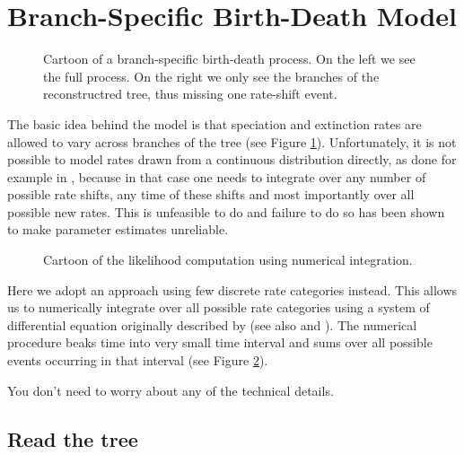 

\bigskip
\section{Branch-Specific Birth-Death Model}

\begin{figure}[htbp!]
\centering
{}
\caption{\small Cartoon of a branch-specific birth-death process. On the left we see the full process. On the right we only see the branches of the reconstructred tree, thus missing one rate-shift event.}
\label{fig:BSBD}
\end{figure}
The basic idea behind the model is that speciation and extinction rates are allowed to vary across branches of the tree (see Figure \ref{fig:BSBD}).
Unfortunately, it is not possible to model rates drawn from a continuous distribution directly, as done for example in \BAMM, because in that case one needs to integrate over any number of possible rate shifts, any time of these shifts and most importantly over all possible new rates.
This is unfeasible to do and failure to do so has been shown to make parameter estimates unreliable.

\begin{figure}[htbp!]
\centering
{}
\caption{\small Cartoon of the likelihood computation using numerical integration.}
\label{fig:BSBD_likelihood}
\end{figure}
Here we adopt an approach using few discrete rate categories instead.
This allows us to numerically integrate over all possible rate categories using a system of differential equation originally described by \cite{Maddison2007} (see also \cite{FitzJohn2009} and \cite{FitzJohn2010}).
The numerical procedure beaks time into very small time interval and sums over all possible events occurring in that interval (see Figure \ref{fig:BSBD_likelihood}).

You don't need to worry about any of the technical details.

\subsection{Read the tree}

